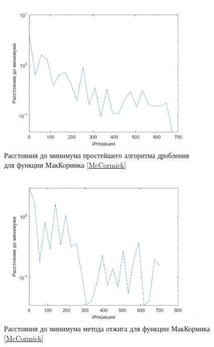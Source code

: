 \begin{figure}[H]
\centering
\includegraphics[width=0.9\textwidth]{Graphics/TrivialDivide_McCormick_dist_to_min.png}
\caption{Расстояния до минимума простейшего алгоритма дробления\\ для функции МакКормика \eqref{McCormick}} 
\end{figure}
\begin{figure}[H]
\centering
\includegraphics[width=0.9\textwidth]{Graphics/SimAnnealing_McCormick_dist_to_min.png}
\caption{Расстояния до минимума метода отжига для функции МакКормика \eqref{McCormick}} 
\end{figure}
